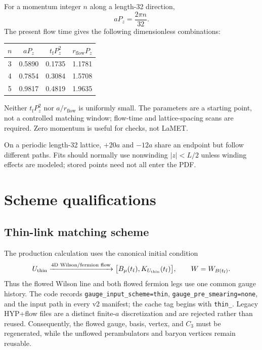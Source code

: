 \documentclass[11pt]{article}
\numberwithin{equation}{section}
\newcommand{\rflow}{r_{\mathrm{flow}}}
\newcommand{\tf}{t_{\mathrm f}}
\begin{document}
For a momentum integer \(n\) along a length-32 direction,
\begin{equation}
  aP_z=\frac{2\pi n}{32}.
\end{equation}
The present flow time gives the following dimensionless combinations:
\begin{center}
\begin{tabular}{cccc}
  \toprule
  \(n\) & \(aP_z\) & \(\tf P_z^2\) & \(\rflow P_z\) \\
  \midrule
  3 & 0.5890 & 0.1735 & 1.1781 \\
  4 & 0.7854 & 0.3084 & 1.5708 \\
  5 & 0.9817 & 0.4819 & 1.9635 \\
  \bottomrule
\end{tabular}
\end{center}
Neither \(\tf P_z^2\) nor \(a/\rflow\) is uniformly small. The parameters are
a starting point, not a controlled matching window; flow-time and
lattice-spacing scans are required. Zero momentum is useful for checks, not
LaMET.

On a periodic length-32 lattice, \(+20a\) and \(-12a\) share an endpoint but
follow different paths. Fits should normally use nonwinding \(|z|<L/2\)
unless winding effects are modeled; stored points need not all enter the PDF.

\section{Scheme qualifications}

\subsection{Thin-link matching scheme}

The production calculation uses the canonical initial condition
\begin{equation}
  U_{\rm thin}
  \xrightarrow{\text{4D Wilson/fermion flow}}
  \bigl[B_\mu(\tf),K_{U_{\rm thin}}(\tf)\bigr],
  \qquad
  W=W_{B(\tf)}.
  \label{eq:thin-link-flow-scheme}
\end{equation}
Thus the flowed Wilson line and both flowed fermion legs use one common gauge
history. The code records \texttt{gauge\_input\_scheme=thin},
\texttt{gauge\_pre\_smearing=none}, and the input path in every v2 manifest;
the cache tag begins with \texttt{thin\_}. Legacy HYP+flow files are a distinct
finite-\(a\) discretization and are rejected rather than reused. Consequently,
the flowed gauge, basis, vertex, and \(C_3\) must be regenerated, while the
unflowed perambulators and baryon vertices remain reusable.
\end{document}
